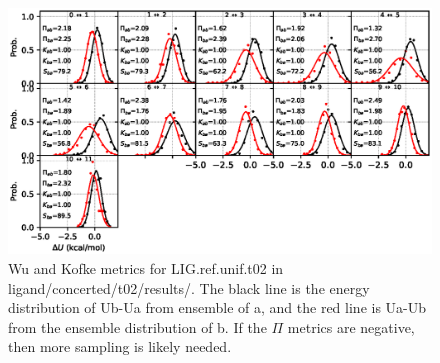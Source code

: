 \documentclass[journal=jctcce,manuscript=article,hyperref=false]{achemso}
\begin{document}
\begin{figure}
\includegraphics[clip,width=6in]{ligand.concerted.t02.results..hist.eps}\vspace{-0.3cm}
                        \caption{Wu and Kofke metrics for LIG.ref.unif.t02 in ligand/concerted/t02/results/. The black line is the energy distribution of Ub-Ua from ensemble of a, and the red line is Ua-Ub from the ensemble distribution of b. If the $\Pi$ metrics are negative, then more sampling is likely needed.}
\end{figure}
\end{document}
